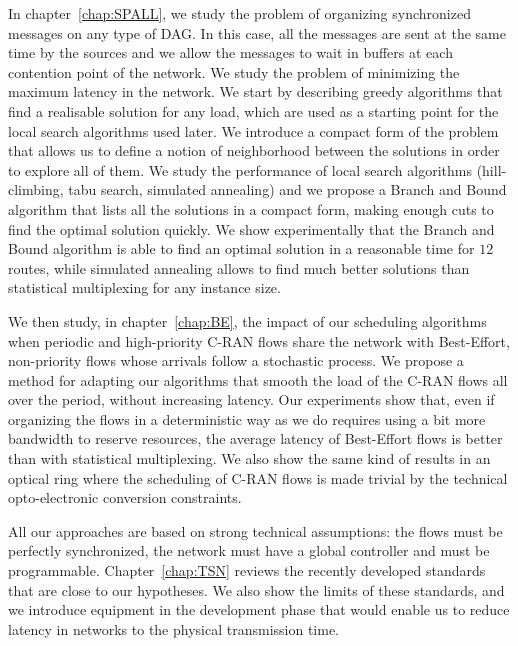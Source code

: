 In chapter~\ref{chap:SPALL}, we study the problem of organizing synchronized messages on any type of DAG. In this case, all the messages are sent at the same time by the sources and we allow the messages to wait in buffers at each contention point of the network. We study the problem of minimizing the maximum latency in the network. We start by describing greedy algorithms that find a realisable solution for any load, which are used as a starting point for the local search algorithms used later. We introduce a compact form of the problem that allows us to define a notion of neighborhood between the solutions in order to explore all of them. We study the performance of local search algorithms (hill-climbing, tabu search, simulated annealing) and we propose a Branch and Bound algorithm that lists all the solutions in a compact form, making enough cuts to find the optimal solution quickly. We show experimentally that the Branch and Bound algorithm is able to find an optimal solution in a reasonable time for $12$ routes, while simulated annealing allows to find much better solutions than statistical multiplexing for any instance size.

We then study, in chapter~\ref{chap:BE}, the impact of our scheduling algorithms when periodic and high-priority C-RAN flows share the network with Best-Effort, non-priority flows whose arrivals follow a stochastic process. We propose a method for adapting our algorithms that smooth the load of the C-RAN flows all over the period, without increasing latency. Our experiments show that, even if organizing the flows in a deterministic way as we do requires using a bit more bandwidth to reserve resources, the average latency of Best-Effort flows is better than with statistical multiplexing. We also show the same kind of results in an optical ring where the scheduling of C-RAN flows is made trivial by the technical opto-electronic conversion constraints. 

All our approaches are based on strong technical assumptions: the flows must be perfectly synchronized, the network must have a global controller and must be programmable. Chapter~\ref{chap:TSN} reviews the recently developed standards that are close to our hypotheses. We also show the limits of these standards, and we introduce equipment in the development phase that would enable us to reduce latency in networks to the physical transmission time.
